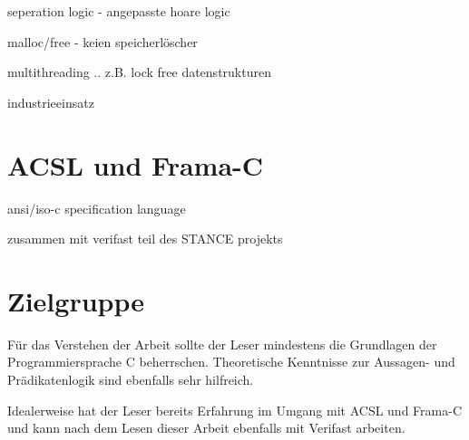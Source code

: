 seperation logic - angepasste hoare logic


malloc/free - keien speicherlöscher


multithreading .. z.B. lock free datenstrukturen


industrieeinsatz

\section{ACSL und Frama-C}
\label{acsl-und-frama-c}

ansi/iso-c specification language


zusammen mit verifast teil des STANCE projekts

\section{Zielgruppe}
\label{sec:zielgruppe}

Für das Verstehen der Arbeit sollte der Leser mindestens die Grundlagen der Programmiersprache C beherrschen.
Theoretische Kenntnisse zur Aussagen- und Prädikatenlogik sind ebenfalls sehr hilfreich.

Idealerweise hat der Leser bereits Erfahrung im Umgang mit ACSL und Frama-C und kann nach dem Lesen dieser Arbeit
ebenfalls mit Verifast arbeiten. 
